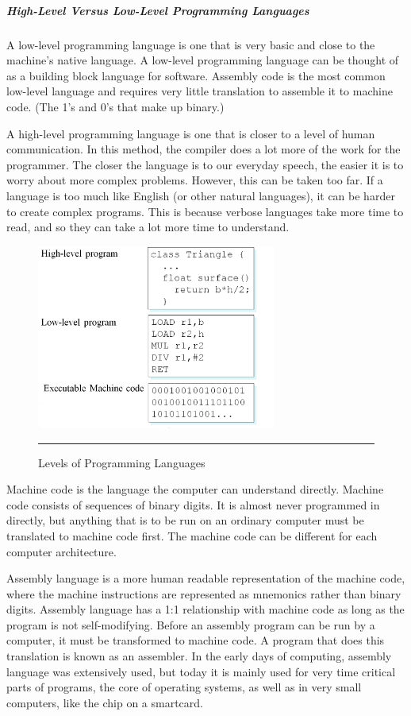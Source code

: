 \subparagraph*{High-Level Versus Low-Level Programming Languages}
\hfill \break
A low-level programming language is one that is very basic and close to the machine's native language. A low-level programming language can be thought of as a building block language for software. Assembly code is the most common low-level language and requires very little translation to assemble it to machine code. (The 1's and 0's that make up binary.)

A high-level programming language is one that is closer to a level of human communication. In this method, the compiler does a lot more of the work for the programmer. The closer the language is to our everyday speech, the easier it is to worry about more complex problems. However, this can be taken too far. If a language is too much like English (or other natural languages), it can be harder to create complex programs. This is because verbose languages take more time to read, and so they can take a lot more time to understand.
\begin{figure}[h!]
        \centering
                \includegraphics[width=0.7\textwidth]{./Pictures/lavels.jpg}
                  \rule{0.7\textwidth}{1pt}
        \caption{Levels of Programming Languages}
\end{figure}

Machine code is the language the computer can understand directly. Machine code consists of sequences of binary digits. It is almost never programmed in directly, but anything that is to be run on an ordinary computer must be translated to machine code first. The machine code can be different for each computer architecture.

Assembly language is a more human readable representation of the machine code, where the machine instructions are represented as mnemonics rather than binary digits. Assembly language has a 1:1 relationship with machine code as long as the program is not self-modifying. Before an assembly program can be run by a computer, it must be transformed to machine code. A program that does this translation is known as an assembler. In the early days of computing, assembly language was extensively used, but today it is mainly used for very time critical parts of programs, the core of operating systems, as well as in very small computers, like the chip on a smartcard.

